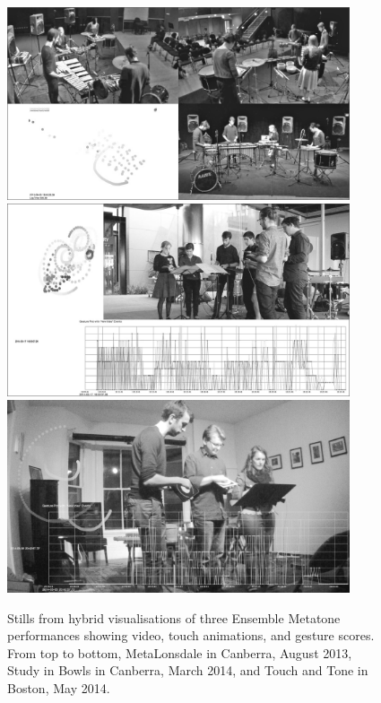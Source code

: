 \documentclass[graybox]{svmult}
\begin{document}
\begin{figure}
  \centering
  \includegraphics[width=0.9\textwidth]{figures/metatone-visualisation-metalonsdale-bw}
  \includegraphics[width=0.9\textwidth]{figures/metatone-visualisation-youarehere-bw}
  \includegraphics[width=0.9\textwidth]{figures/metatone-visualisation-touchandtone-bw}
  \caption{Stills from hybrid visualisations of three Ensemble Metatone
    performances showing video, touch animations, and gesture scores.
    From top to bottom, MetaLonsdale in Canberra, August 2013, Study
    in Bowls in Canberra, March 2014, and Touch and Tone in Boston,
    May 2014.}
  \label{fig:metatone-visualisations}
\end{figure}
\end{document}
